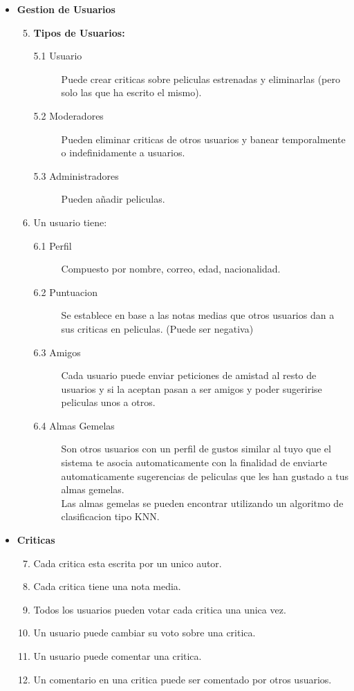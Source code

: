 \documentclass{article}
\begin{document}
\begin{itemize}
		
	\item \textbf{Gestion de Usuarios}
		\begin{enumerate}[label=\bfseries RF- \arabic*:]
		\setcounter{enumi}{4}
		\item \textbf{Tipos de Usuarios:}
			\begin{description}
				\item[5.1 Usuario] Puede crear criticas sobre peliculas estrenadas y eliminarlas (pero solo las que ha escrito el mismo).
				\item[5.2 Moderadores] Pueden eliminar criticas de otros usuarios y banear temporalmente o indefinidamente a usuarios.
				\item[5.3 Administradores] Pueden añadir peliculas.
			\end{description}
		\item Un usuario tiene:
			\begin{description}
				\item[6.1 Perfil] Compuesto por nombre, correo, edad, nacionalidad.
				\item[6.2 Puntuacion] Se establece en base a las notas medias que otros usuarios dan a sus criticas en peliculas. (Puede ser negativa)
				\item[6.3 Amigos] Cada usuario puede enviar peticiones de amistad al resto de usuarios y si la aceptan pasan a ser amigos y poder sugeririse peliculas unos a otros.
				\item[6.4 Almas Gemelas] Son otros usuarios con un perfil de gustos similar al tuyo que el sistema te asocia automaticamente con la finalidad de enviarte automaticamente sugerencias de peliculas que les han gustado a tus almas gemelas.
				\\Las almas gemelas se pueden encontrar utilizando un algoritmo de clasificacion tipo KNN.				
			\end{description}
		\end{enumerate}
	
	\item \textbf{Criticas}
		\begin{enumerate}[label=\bfseries RF- \arabic*:]
		\setcounter{enumi}{6}
		\item Cada critica esta escrita por un unico autor.
		\item Cada critica tiene una nota media.
		\item Todos los usuarios pueden votar cada critica una unica vez.
		\item Un usuario puede cambiar su voto sobre una critica.
		\item Un usuario puede comentar una critica.
		\item Un comentario en una critica puede ser comentado por otros usuarios.
		\end{enumerate}
	\end{itemize}	
	
\end{document}
